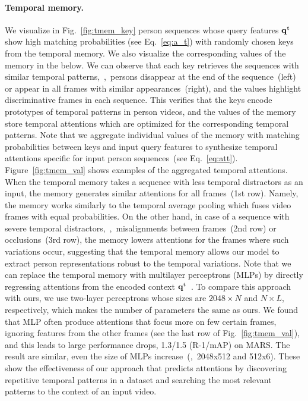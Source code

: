 \documentclass[10pt,twocolumn,letterpaper]{article}
\begin{document}
		\vspace{-0.5cm}
		\paragraph{Temporal memory.}
		
			We visualize in Fig.~\ref{fig:tmem_key} person sequences whose query features $\mathbf{q}^{\text t}$ show high matching probabilities (see Eq.~\eqref{eq:a_t}) with randomly chosen keys from the temporal memory. We also visualize the corresponding values of the memory in the below. We can observe that each key retrieves the sequences with similar temporal patterns,~\eg,~persons disappear at the end of the sequence~(left) or appear in all frames with similar appearances~(right), and the values highlight discriminative frames in each sequence. This verifies that the keys encode prototypes of temporal patterns in person videos, and the values of the memory store temporal attentions which are optimized for the corresponding temporal patterns. Note that we aggregate individual values of the memory with matching probabilities between keys and input query features to synthesize temporal attentions specific for input person sequences~(see Eq.~\eqref{eq:att}). Figure~\ref{fig:tmem_val} shows examples of the aggregated temporal attentions. When the temporal memory takes a sequence with less temporal distractors as an input, the memory generates similar attentions for all frames~(1st row). Namely, the memory works similarly to the temporal average pooling which fuses video frames with equal probabilities. On the other hand, in case of a sequence with severe temporal distractors,~\eg,~misalignments between frames~(2nd row) or occlusions~(3rd row), the memory lowers attentions for the frames where such variations occur, suggesting that the temporal memory allows our model to extract person representations robust to the temporal variations. Note that we can replace the temporal memory with multilayer perceptrons (MLPs) by directly regressing attentions from the encoded context $\mathbf{q}^{\text t}$~\cite{li2018diversity}. To compare this approach with ours, we use two-layer perceptrons whose sizes are $2048 \times N$ and $N \times L$, respectively, which makes the number of parameters the same as ours. We found that MLP often produce attentions that focus more on few certain frames, ignoring features from the other frames (see the last row of Fig.~\ref{fig:tmem_val}), and this leads to large performance drops, 1.3/1.5 (R-1/mAP) on MARS. The result are similar, even the size of MLPs increase~(\eg,~2048x512 and 512x6). These show the effectiveness of our approach that predicts attentions by discovering repetitive temporal patterns in a dataset and searching the most relevant patterns to the context of an input video.
			
\end{document}
